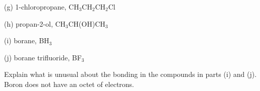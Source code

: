 \documentclass{article}[11pt]
\begin{document}
\newline
\newline
(g) 1-chloropropane, CH$_{3}$CH$_{2}$CH$_{2}$Cl
\newline
\newline
\begin{center}  \end{center}
\newline
\newline
(h) propan-2-ol, CH$_{3}$CH(OH)CH$_{3}$
\newline
\newline
\begin{center}  \end{center}
\newline
\newline
(i) borane, BH$_{3}$
\newline
\newline
\begin{center}  \end{center}
\newline
\newline
(j) borane trifluoride, BF$_{3}$
\newline
\newline
\begin{center}  \end{center}
\newline
\newline
\noindent
Explain what is unusual about the bonding in the compounds in parts (i) and (j).
\newline
\newline
Boron does not have an octet of electrons.
\newline
\end{document}
